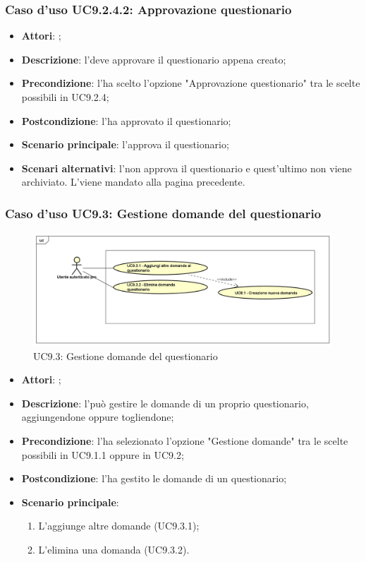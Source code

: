 			\subsubsection{Caso d'uso UC9.2.4.2: Approvazione questionario}
			\label{UC9.2.4.2}
			\begin{itemize}
				\item \textbf{Attori}: \uaupro;
				\item \textbf{Descrizione}: l'\uaupro deve approvare il questionario appena creato;
				\item \textbf{Precondizione}: l'\uaupro ha scelto l'opzione "Approvazione questionario" tra le scelte possibili in UC9.2.4; 
				\item \textbf{Postcondizione}: l'\uaupro ha approvato il questionario;
				\item \textbf{Scenario principale}: l'\uaupro approva il questionario;
				\item \textbf{Scenari alternativi}: l'\uaupro non approva il questionario e quest'ultimo non viene archiviato. L'\uaupro viene mandato alla pagina precedente.
			\end{itemize}				
	 
	 \subsubsection{Caso d'uso UC9.3: Gestione domande del questionario}
	 \label{UC9.3}
	 \begin{figure}[h]
	 	\centering
	 	\includegraphics[scale=0.5,keepaspectratio]{UML/UC9_3.png}
	 	\caption{UC9.3: Gestione domande del questionario}
	 \end{figure}
	 \FloatBarrier
	 \begin{itemize}
	 	\item \textbf{Attori}: \uaupro;
	 	\item \textbf{Descrizione}: l'\uaupro può gestire le domande di un proprio questionario, aggiungendone oppure togliendone;
	 	\item \textbf{Precondizione}: l'\uaupro ha selezionato l'opzione "Gestione domande" tra le scelte possibili in UC9.1.1 oppure in UC9.2;
	 	\item \textbf{Postcondizione}: l'\uaupro ha gestito le domande di un questionario;
	 	\item \textbf{Scenario principale}: 
	 	\begin{enumerate}
	 		\item L'\uaupro aggiunge altre domande (UC9.3.1);
	 		\item L'\uaupro elimina una domanda (UC9.3.2).
	 	\end{enumerate}
	 \end{itemize}
	 

